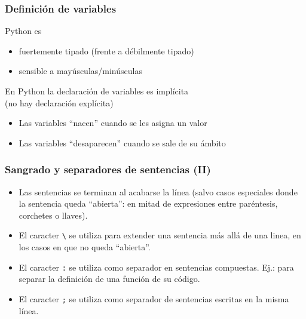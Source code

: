 \begin{frame}
\frametitle{Definición de variables}

Python es
\begin{itemize}
\item fuertemente tipado (frente a débilmente tipado)
\item sensible a mayúsculas/minúsculas
\end{itemize}



En Python la declaración de variables es implícita \\(no hay declaración explícita)
\begin{itemize}
\item Las variables ``nacen'' cuando se les asigna un valor
\item Las variables ``desaparecen'' cuando se sale de su ámbito
\end{itemize}  
\end{frame}


\begin{frame}[fragile]
\frametitle{Sangrado y separadores de sentencias (II)}

\begin{itemize}
\item Las sentencias se terminan al acabarse la línea (salvo casos
  especiales donde la sentencia queda ``abierta'': en mitad de
  expresiones entre paréntesis, corchetes o llaves).
  
\item El caracter \verb|\| se utiliza para extender una sentencia más
  allá de una linea, en los casos en que no queda ``abierta''. 

\item El caracter \verb|:| se utiliza como separador en sentencias
  compuestas. Ej.: para separar la definición de una función de su
  código.
  
\item El caracter \verb|;| se utiliza como separador de sentencias
  escritas en la misma línea.

\end{itemize}
\end{frame}




